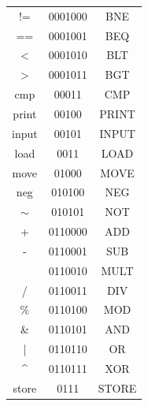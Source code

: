 \begin{minipage}[t]{0.48\textwidth}
\begin{minipage}[t]{0.5\textwidth}
\begin{tabular}{>{\ttfamily\footnotesize}c|>{\ttfamily\footnotesize}c|>{\ttfamily\footnotesize}c}
!=                 & 0001000   & BNE   \\
==                 & 0001001   & BEQ   \\
\textless{}        & 0001010   & BLT   \\
\textgreater{}     & 0001011   & BGT   \\
cmp                & 00011     & CMP   \\
print              & 00100    & PRINT \\
input              & 00101    & INPUT \\
load               & 0011     & LOAD  \\
move               & 01000   & MOVE  \\
neg                & 010100  & NEG   \\
$\sim$             & 010101  & NOT   \\
+                  & 0110000 & ADD   \\
-                  & 0110001 & SUB   \\
*                  & 0110010 & MULT  \\
/                  & 0110011 & DIV   \\
\%                 & 0110100 & MOD   \\
\&                 & 0110101 & AND   \\
|                  & 0110110 & OR    \\
\textasciicircum{} & 0110111 & XOR   \\
store              & 0111    & STORE
\end{tabular}
\end{minipage}
\end{minipage}
\hfill
